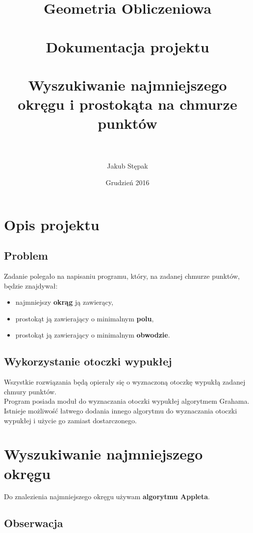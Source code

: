 \documentclass[hidelinks]{article}
\title{
Geometria Obliczeniowa \\ ~ \\ Dokumentacja projektu \\ ~ \\ Wyszukiwanie najmniejszego okręgu i prostokąta na chmurze punktów\\ ~ \\ 
}
\author{Jakub Stępak}
\date{Grudzień 2016}
\begin{document}
\maketitle

\tableofcontents

\newpage

\section{Opis projektu}

\subsection{Problem}

Zadanie polegało na napisaniu programu, który, na zadanej chmurze punktów, będzie znajdywał:
\begin{itemize}
\item najmniejszy \textbf{okrąg} ją zawierący,
\item prostokąt ją zawierający o minimalnym \textbf{polu},
\item prostokąt ją zawierający o minimalnym \textbf{obwodzie}.
\end{itemize}


\subsection{Wykorzystanie otoczki wypukłej}

Wszystkie rozwiązania będą opierały się o wyznaczoną otoczkę wypukłą zadanej chmury punktów. \\

Program posiada moduł do wyznaczania otoczki wypukłej algorytmem Grahama. Istnieje możliwość łatwego dodania innego algorytmu do wyznaczania otoczki wypukłej i użycie go zamiast dostarczonego.

\newpage

\section{Wyszukiwanie najmniejszego okręgu}

Do znalezienia najmniejszego okręgu używam \textbf{algorytmu Appleta}.

\subsection{Obserwacja}
\end{document}
